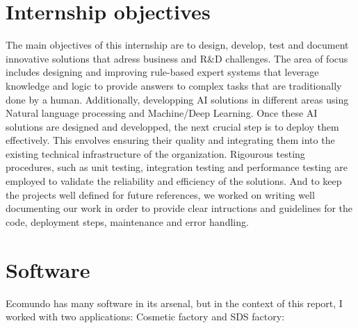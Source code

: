 \documentclass[a4paper,12pt,twoside]{report}
\begin{document}
\section{Internship objectives}
The main objectives of this internship are to design, develop, test and document innovative solutions that adress business and R\&D challenges. The area of focus includes designing and improving rule-based expert systems that leverage knowledge and logic to provide answers to complex tasks that are traditionally done by a human. Additionally, developping AI solutions in different areas using Natural language processing and Machine/Deep Learning. Once these AI solutions are designed and developped, the next crucial step is to deploy them effectively. This envolves ensuring their quality and integrating them into the existing technical infrastructure of the organization. Rigourous testing procedures, such as unit testing, integration testing and performance testing are employed to validate the reliability and efficiency of the solutions. And to keep the projects well defined for future references, we worked on writing well documenting our work in order to provide clear intructions and guidelines for the code, deployment steps, maintenance and error handling.

\section{Software}
Ecomundo has many software in its arsenal, but in the context of this report, I worked with two applications: Cosmetic factory and SDS factory:
\end{document}
